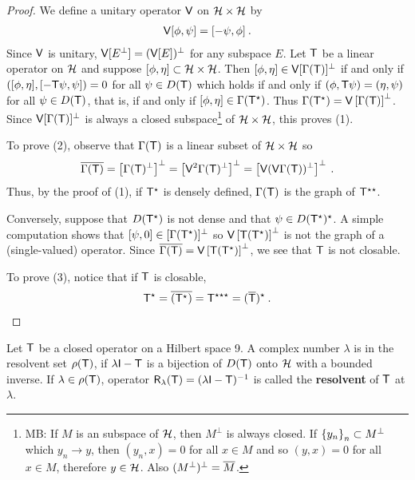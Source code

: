 \begin{proof}
We define a unitary operator $\mathsf{V}$ on $\mathcal{H} \times \mathcal{H}$ by
\begin{align}
    \mathsf{V} [\phi, \psi] = [-\psi, \phi] \:.
\end{align}
Since $\mathsf{V}$ is unitary, $\mathsf{V}[E^\bot] = (\mathsf{V}[E])^\bot$ for any subspace $E$. Let $\mathsf{T}$ be a linear operator on $\mathcal{H}$ and suppose $[\phi, \eta] \subset \mathcal{H} \times \mathcal{H}$. Then $[\phi, \eta] \in \mathsf{V}[\Gamma(\mathsf{T})]^\bot$ if and only if $\left( [\phi, \eta], [- \mathsf{T} \psi, \psi] \right) = 0$ for all $\psi \in D(\mathsf{T})$ which holds if and only if $(\phi, \mathsf{T} \psi) = (\eta, \psi)$ for all $\psi \in D(\mathsf{T})$, that is, if and only if $[\phi, \eta] \in \Gamma(\mathsf{T}^\star)$. Thus $\Gamma(\mathsf{T}^\star) = \mathsf{V} \left[\Gamma(\mathsf{T}) \right]^\bot$. 
Since $\mathsf{V}[\Gamma(\mathsf{T})]^\bot$ is always a closed subspace\footnote[1]{MB: If $M$ is an subspace of $\mathcal{H}$, then $M^\bot$ is always closed. If $\left \lbrace y_n \right \rbrace_n \subset M^\bot$ which $y_n \rightarrow y$, then $(y_n,x) = 0$ for all $x \in M$ and so $(y,x) = 0$ for all $x \in M$, therefore $y \in \mathcal{H}$. Also $(M^\bot)^\bot = \overline{M}$.} of $\mathcal{H} \times \mathcal{H}$, this proves (1).

To prove (2), observe that $\Gamma(\mathsf{T})$ is a linear subset of $\mathcal{H} \times \mathcal{H}$ so
\begin{align}
    \overline{\Gamma(\mathsf{T})} = \left[ \Gamma(\mathsf{T})^\bot \right]^\bot = \left[ \mathsf{V}^2 \Gamma(\mathsf{T})^\bot \right]^\bot = \left[ \mathsf{V}(\mathsf{V} \Gamma(\mathsf{T}))^\bot \right]^\bot \:.
\end{align}
Thus, by the proof of (1), if $\mathsf{T}^\star$ is densely defined, $\Gamma(\mathsf{T})$ is the graph of $\mathsf{T}^{\star \star}$.

Conversely, suppose that $D(\mathsf{T}^\star)$ is not dense and that $ \psi \in D(\mathsf{T}^\star)^\star$. A simple computation shows that $[\psi,0] \in [\Gamma(\mathsf{T}^\star)]^\bot$ so $\mathsf{V}\left[\mathsf{T}(\mathsf{T}^\star)\right]^\bot$ is not the graph of a (single-valued) operator. Since $\overline{\Gamma(\mathsf{T})} = \mathsf{V}\left[\mathsf{T}(\mathsf{T}^\star)\right]^\bot$, we see that $\mathsf{T}$ is not closable.

To prove (3), notice that if $\mathsf{T}$ is closable,
\begin{align}
    \mathsf{T}^\star = \overline{(\mathsf{T}^\star)} = \mathsf{T}^{\star \star \star} =(\overline{\mathsf{T}})^\star \:.
\end{align}
\end{proof}

\begin{definition}
Let $\mathsf{T}$ be a closed operator on a Hilbert space 9. A complex number $\lambda$ is in the resolvent set $\rho(\mathsf{T})$, if $ \lambda \mathsf{I} - \mathsf{T}$ is a bijection of $D(\mathsf{T})$ onto $\mathcal{H}$ with a bounded inverse. If $\lambda \in \rho(\mathsf{T})$, operator $\mathsf{R}_\lambda(\mathsf{T}) = (\lambda \mathsf{I} - \mathsf{T})^{-1}$ is called the \textbf{resolvent} of $\mathsf{T}$
at $\lambda$.
\end{definition}

